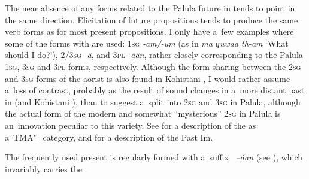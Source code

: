 \largerpage[-1]
The near absence of any forms related to the Palula future in \iliKalkoti tends to point in the same direction. Elicitation of future propositions tends to produce the same  verb forms as for most present  propositions. I only have a~few examples where some of the forms with  are used: \textsc{1sg} \textit{-am/-um} (as in \textit{ma ɡuwaa th-am} `What should I do?'), \textsc{2/3sg} \textit{-ä}, and \textsc{3pl} \textit{-ään}, rather closely corresponding to the Palula \textsc{1sg}, \textsc{3sg} and \textsc{3pl} forms, respectively. Although the form sharing between the \textsc{2sg} and \textsc{3sg} forms of the aorist is also found in Kohistani \iliShina \citep[39]{schmidt2004}, I would rather assume a~loss of contrast, probably as the result of sound changes in a~more distant past in \iliKalkoti (and Kohistani \iliShina), than to suggest a~split into \textsc{2sg} and \textsc{3sg} in Palula, although the actual form of the modern and somewhat ``mysterious'' \textsc{2sg} in Palula is an~innovation peculiar to this \iliShina variety. See  for a description of the  as a~TMA"=category, and  for a description of the Past Im.


 The frequently used present  is regularly formed with a~suffix
\textit{~--áan} (see ), which invariably carries the .


